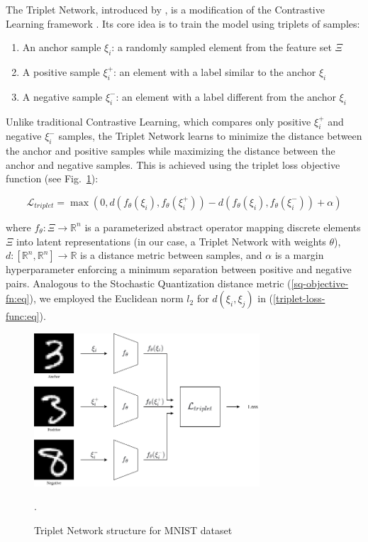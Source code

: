 The Triplet Network, introduced by \cite{Hoffer_2015}, is a modification of the Contrastive Learning framework \cite{Khosla_2020}. Its core idea is to train the model using triplets of samples:

\begin{enumerate}
    \item An anchor sample $\xi_i$: a randomly sampled element from the feature set $\Xi$
    \item A positive sample $\xi^+_i$: an element with a label similar to the anchor $\xi_i$
    \item A negative sample $\xi^-_i$: an element with a label different from the anchor $\xi_i$
\end{enumerate}

Unlike traditional Contrastive Learning, which compares only positive $\xi^+_i$ and negative $\xi^-_i$ samples, the Triplet Network learns to minimize the distance between the anchor and positive samples while maximizing the distance between the anchor and negative samples. This is achieved using the triplet loss objective function (see Fig.~\ref{triplet-network:fig}):

\begin{equation}
    \label{triplet-loss-func:eq}
    \mathcal{L}_{triplet} = \max (0, d(f_{\theta}(\xi_i), f_{\theta}(\xi^+_i)) - d(f_{\theta}(\xi_i), f_{\theta}(\xi^-_i)) + \alpha)
\end{equation}

\noindent where $f_{\theta}: \Xi \to \mathbb{R}^n$ is a parameterized abstract operator mapping discrete elements $\Xi$ into latent representations (in our case, a Triplet Network with weights $\theta$), $d: [\mathbb{R}^n, \mathbb{R}^n] \to \mathbb{R}$ is a distance metric between samples, and $\alpha$ is a margin hyperparameter enforcing a minimum separation between positive and negative pairs. Analogous to the Stochastic Quantization distance metric (\ref{sq-objective-fn:eq}), we employed the Euclidean norm $l_2$ for $d(\xi_i, \xi_j)$ in (\ref{triplet-loss-func:eq}).

\begin{figure}
    \centering
    \includegraphics[width=0.75\textwidth]{figures/triplet_loss.png}
    \caption{Triplet Network structure for MNIST dataset \cite{lecun2010mnist}}. \label{triplet-network:fig}
\end{figure}

